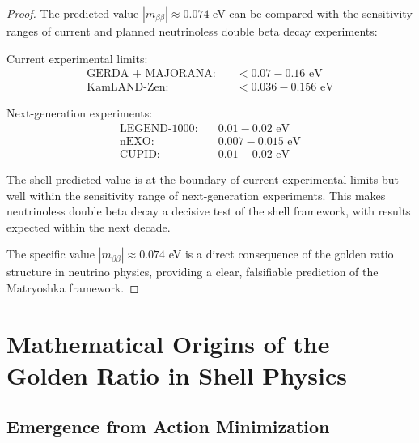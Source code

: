\documentclass[12pt,a4paper]{article}
\begin{document}
\begin{proof}
The predicted value $|m_{\beta\beta}| \approx 0.074$ eV can be compared with the sensitivity ranges of current and planned neutrinoless double beta decay experiments:

Current experimental limits:
\begin{align}
\text{GERDA + MAJORANA}: &\quad < 0.07-0.16 \text{ eV} \\
\text{KamLAND-Zen}: &\quad < 0.036-0.156 \text{ eV}
\end{align}

Next-generation experiments:
\begin{align}
\text{LEGEND-1000}: &\quad 0.01-0.02 \text{ eV} \\
\text{nEXO}: &\quad 0.007-0.015 \text{ eV} \\
\text{CUPID}: &\quad 0.01-0.02 \text{ eV}
\end{align}

The shell-predicted value is at the boundary of current experimental limits but well within the sensitivity range of next-generation experiments. This makes neutrinoless double beta decay a decisive test of the shell framework, with results expected within the next decade.

The specific value $|m_{\beta\beta}| \approx 0.074$ eV is a direct consequence of the golden ratio structure in neutrino physics, providing a clear, falsifiable prediction of the Matryoshka framework.
\end{proof}

\section{Mathematical Origins of the Golden Ratio in Shell Physics}
\label{sec:mathematical-origins}

\subsection{Emergence from Action Minimization}
\label{subsec:action-minimization}
\end{document}
